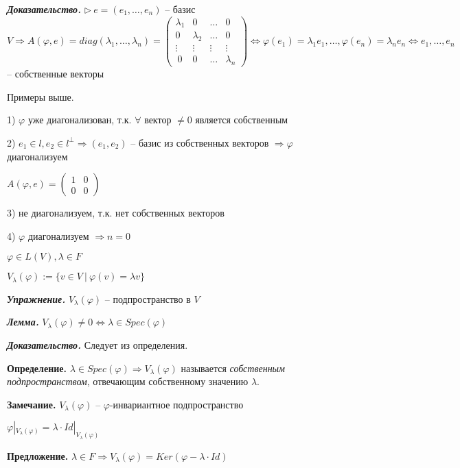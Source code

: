 \bigskip
\textbf{\textit{Доказательство.}} $\rhd \ e = (e_1, \dots, e_n)$ -- базис $V \Rightarrow A(\varphi, e) = diag(\lambda_1, \dots, \lambda_n) = \begin{pmatrix} \lambda_1 & 0 & \dots & 0 \\ 0 & \lambda_2 & \dots & 0 \\ \vdots & \vdots & \vdots & \vdots \\ \ 0 & 0 & \dots & \lambda_n \end{pmatrix} \Leftrightarrow \varphi(e_1) = \lambda_1 e_1, \dots, \varphi(e_n) = \lambda_n e_n \Leftrightarrow e_1, \dots, e_n$ -- собственные векторы

\bigskip
Примеры выше.

1) $\varphi$ уже диагонализован, т.к. $\forall$ вектор $\neq 0$ является собственным

2) $e_1 \in l, e_2 \in l^{\bot} \Rightarrow (e_1, e_2)$ -- базис из собственных векторов $\Rightarrow \varphi$ диагонализуем

$A(\varphi, e) = \begin{pmatrix} 1 & 0 \\ 0 & 0 \end{pmatrix}$

3) не диагонализуем, т.к. нет собственных векторов

4) $\varphi$ диагонализуем $\Rightarrow n = 0$

\bigskip
$\varphi \in L(V), \lambda \in F$

$V_{\lambda} (\varphi) := \{v \in V \ | \ \varphi(v) = \lambda v \}$

\bigskip
\textbf{\textit{Упражнение.}} $V_{\lambda} (\varphi)$ -- подпространство в $V$

\bigskip
\textbf{\textit{Лемма.}} $V_{\lambda} (\varphi) \neq 0 \Leftrightarrow \lambda \in Spec(\varphi)$

\bigskip
\textbf{\textit{Доказательство.}} Следует из определения.

\bigskip
\textbf{Определение.} $\lambda \in Spec(\varphi) \Rightarrow V_{\lambda} (\varphi)$ называется \textit{собственным подпространством}, отвечающим собственному значению $\lambda$.

\bigskip
\textbf{Замечание.} $V_{\lambda} (\varphi)$ -- $\varphi$-инвариантное подпространство

$\varphi |_{V_{\lambda} (\varphi)} = \lambda \cdot Id |_{V_{\lambda} (\varphi)}$

\bigskip
\textbf{Предложение.} $\lambda \in F \Rightarrow V_{\lambda} (\varphi) = Ker(\varphi - \lambda \cdot Id)$


